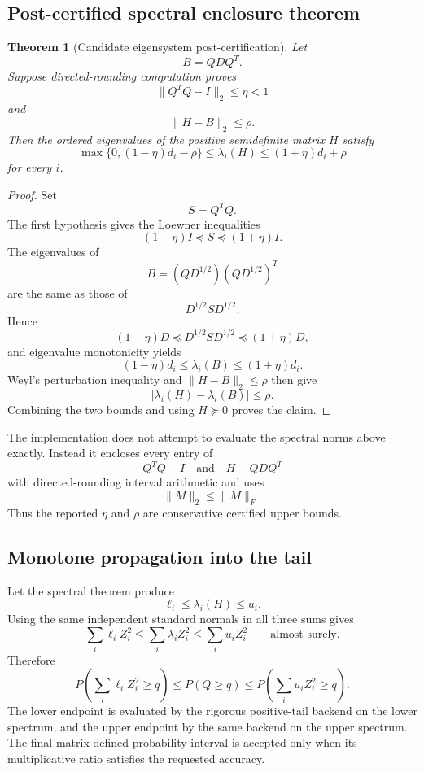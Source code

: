 \documentclass[11pt]{article}
\newtheorem{theorem}{Theorem}[section]
\theoremstyle{definition}
\theoremstyle{remark}
\begin{document}
\subsection{Post-certified spectral enclosure theorem}

\begin{theorem}[Candidate eigensystem post-certification]
Let
\[
B=QDQ^T.
\]
Suppose directed-rounding computation proves
\[
\|Q^TQ-I\|_2\le\eta<1
\]
and
\[
\|H-B\|_2\le\rho.
\]
Then the ordered eigenvalues of the positive semidefinite matrix \(H\) satisfy
\[
\boxed{
\max\{0,(1-\eta)d_i-\rho\}
\le
\lambda_i(H)
\le
(1+\eta)d_i+\rho
}
\]
for every \(i\).
\end{theorem}

\begin{proof}
Set
\[
S=Q^TQ.
\]
The first hypothesis gives the Loewner inequalities
\[
(1-\eta)I\preceq S\preceq(1+\eta)I.
\]
The eigenvalues of
\[
B=(QD^{1/2})(QD^{1/2})^T
\]
are the same as those of
\[
D^{1/2}SD^{1/2}.
\]
Hence
\[
(1-\eta)D
\preceq
D^{1/2}SD^{1/2}
\preceq
(1+\eta)D,
\]
and eigenvalue monotonicity yields
\[
(1-\eta)d_i
\le
\lambda_i(B)
\le
(1+\eta)d_i.
\]
Weyl's perturbation inequality and
\(\|H-B\|_2\le\rho\) then give
\[
|\lambda_i(H)-\lambda_i(B)|\le\rho.
\]
Combining the two bounds and using \(H\succeq0\) proves the claim.
\end{proof}

The implementation does not attempt to evaluate the spectral norms above
exactly.  Instead it encloses every entry of
\[
Q^TQ-I
\quad\text{and}\quad
H-QDQ^T
\]
with directed-rounding interval arithmetic and uses
\[
\|M\|_2\le\|M\|_F.
\]
Thus the reported \(\eta\) and \(\rho\) are conservative certified upper
bounds.

\subsection{Monotone propagation into the tail}

Let the spectral theorem produce
\[
\ell_i\le\lambda_i(H)\le u_i.
\]
Using the same independent standard normals in all three sums gives
\[
\sum_i\ell_iZ_i^2
\le
\sum_i\lambda_iZ_i^2
\le
\sum_i u_iZ_i^2
\qquad\text{almost surely}.
\]
Therefore
\[
\boxed{
P\!\left(\sum_i\ell_iZ_i^2\ge q\right)
\le
P(Q\ge q)
\le
P\!\left(\sum_i u_iZ_i^2\ge q\right).
}
\]
The lower endpoint is evaluated by the rigorous positive-tail backend on the
lower spectrum, and the upper endpoint by the same backend on the upper
spectrum.  The final matrix-defined probability interval is accepted only when
its multiplicative ratio satisfies the requested accuracy.
\end{document}

